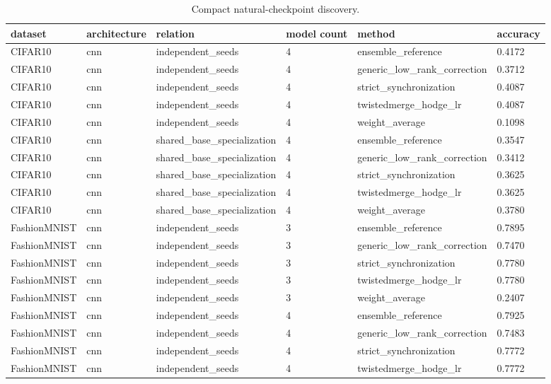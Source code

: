 \begin{table}[t]
\centering
\caption{Compact natural-checkpoint discovery.}
\begin{tabular}{llllll}
\toprule
dataset & architecture & relation & model count & method & accuracy \\
\midrule
CIFAR10 & cnn & independent\_seeds & 4 & ensemble\_reference & 0.4172 \\
CIFAR10 & cnn & independent\_seeds & 4 & generic\_low\_rank\_correction & 0.3712 \\
CIFAR10 & cnn & independent\_seeds & 4 & strict\_synchronization & 0.4087 \\
CIFAR10 & cnn & independent\_seeds & 4 & twistedmerge\_hodge\_lr & 0.4087 \\
CIFAR10 & cnn & independent\_seeds & 4 & weight\_average & 0.1098 \\
CIFAR10 & cnn & shared\_base\_specialization & 4 & ensemble\_reference & 0.3547 \\
CIFAR10 & cnn & shared\_base\_specialization & 4 & generic\_low\_rank\_correction & 0.3412 \\
CIFAR10 & cnn & shared\_base\_specialization & 4 & strict\_synchronization & 0.3625 \\
CIFAR10 & cnn & shared\_base\_specialization & 4 & twistedmerge\_hodge\_lr & 0.3625 \\
CIFAR10 & cnn & shared\_base\_specialization & 4 & weight\_average & 0.3780 \\
FashionMNIST & cnn & independent\_seeds & 3 & ensemble\_reference & 0.7895 \\
FashionMNIST & cnn & independent\_seeds & 3 & generic\_low\_rank\_correction & 0.7470 \\
FashionMNIST & cnn & independent\_seeds & 3 & strict\_synchronization & 0.7780 \\
FashionMNIST & cnn & independent\_seeds & 3 & twistedmerge\_hodge\_lr & 0.7780 \\
FashionMNIST & cnn & independent\_seeds & 3 & weight\_average & 0.2407 \\
FashionMNIST & cnn & independent\_seeds & 4 & ensemble\_reference & 0.7925 \\
FashionMNIST & cnn & independent\_seeds & 4 & generic\_low\_rank\_correction & 0.7483 \\
FashionMNIST & cnn & independent\_seeds & 4 & strict\_synchronization & 0.7772 \\
FashionMNIST & cnn & independent\_seeds & 4 & twistedmerge\_hodge\_lr & 0.7772 \\

\end{tabular}
\end{table}
